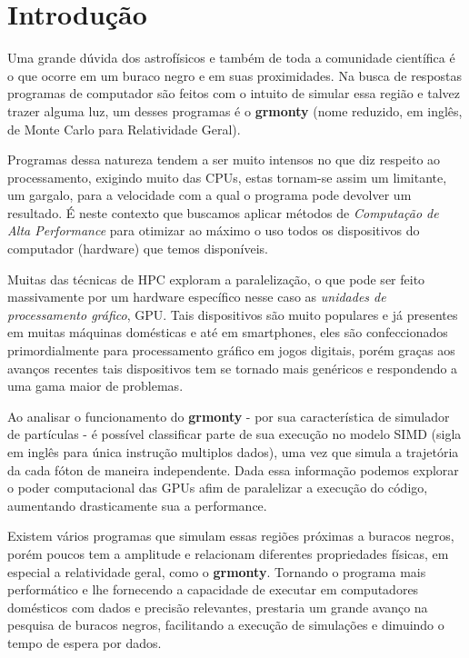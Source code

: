 \chapter{Introdução}
\label{cap:introducao}

Uma grande dúvida dos astrofísicos e também de toda a comunidade científica é o que ocorre em um buraco negro e em suas proximidades. Na busca de respostas programas de computador são feitos com o intuito de simular essa região e talvez trazer alguma luz, um desses programas é o \textbf{grmonty}\citep{Dolence:09} (nome reduzido, em inglês, de Monte Carlo para Relatividade Geral).

Programas dessa natureza tendem a ser muito intensos no que diz respeito ao processamento, exigindo muito das CPUs, estas tornam-se assim um limitante, um gargalo, para a velocidade com a qual o programa pode devolver um resultado. É neste contexto que buscamos aplicar métodos de \emph{Computação de Alta Performance} para otimizar ao máximo o uso todos os dispositivos do computador (hardware) que temos disponíveis.

Muitas das técnicas de HPC exploram a paralelização, o que pode ser feito massivamente por um hardware específico nesse caso as \emph{unidades de processamento gráfico}, GPU. Tais dispositivos são muito populares e já presentes em muitas máquinas domésticas e até em smartphones, eles são confeccionados primordialmente para processamento gráfico em jogos digitais, porém graças aos avanços recentes tais dispositivos tem se tornado mais genéricos e respondendo a uma gama maior de problemas.

Ao analisar o funcionamento do \textbf{grmonty} - por sua característica de simulador de partículas - é possível classificar parte de sua execução no modelo SIMD (sigla em inglês para única instrução multiplos dados), uma vez que simula a trajetória da cada fóton de maneira independente. Dada essa informação podemos explorar o poder computacional das GPUs afim de paralelizar a execução do código, aumentando drasticamente sua a performance.

Existem vários programas que simulam essas regiões próximas a buracos negros, porém poucos tem a amplitude e relacionam diferentes propriedades físicas, em especial a relatividade geral, como o \textbf{grmonty}. Tornando o programa mais performático e lhe fornecendo a capacidade de executar em computadores domésticos com dados e precisão relevantes, prestaria um grande avanço na pesquisa de buracos negros, facilitando a execução de simulações e dimuindo o tempo de espera por dados.

